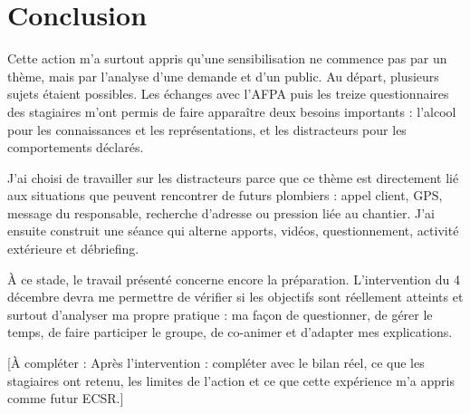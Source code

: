 \chapter{Conclusion}
Cette action m’a surtout appris qu’une sensibilisation ne commence pas par un thème, mais par l’analyse d’une demande et d’un public. Au départ, plusieurs sujets étaient possibles. Les échanges avec l’AFPA puis les treize questionnaires des stagiaires m’ont permis de faire apparaître deux besoins importants : l’alcool pour les connaissances et les représentations, et les distracteurs pour les comportements déclarés.

J’ai choisi de travailler sur les distracteurs parce que ce thème est directement lié aux situations que peuvent rencontrer de futurs plombiers : appel client, GPS, message du responsable, recherche d’adresse ou pression liée au chantier. J’ai ensuite construit une séance qui alterne apports, vidéos, questionnement, activité extérieure et débriefing.

À ce stade, le travail présenté concerne encore la préparation. L’intervention du 4 décembre devra me permettre de vérifier si les objectifs sont réellement atteints et surtout d’analyser ma propre pratique : ma façon de questionner, de gérer le temps, de faire participer le groupe, de co-animer et d’adapter mes explications.

[À compléter : Après l’intervention : compléter avec le bilan réel, ce que les stagiaires ont retenu, les limites de l’action et ce que cette expérience m’a appris comme futur ECSR.]
